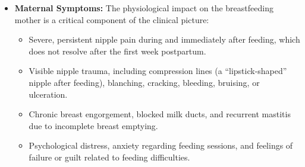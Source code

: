 \begin{itemize}
\begin{itemize}
    \end{itemize}
  \item \textbf{Maternal Symptoms:} The physiological impact on the breastfeeding mother is a critical component of the clinical picture:
    \begin{itemize}
      \item Severe, persistent nipple pain during and immediately after feeding, which does not resolve after the first week postpartum.
      \item Visible nipple trauma, including compression lines (a ``lipstick-shaped'' nipple after feeding), blanching, cracking, bleeding, bruising, or ulceration.
      \item Chronic breast engorgement, blocked milk ducts, and recurrent mastitis due to incomplete breast emptying.
      \item Psychological distress, anxiety regarding feeding sessions, and feelings of failure or guilt related to feeding difficulties.
    \end{itemize}
\end{itemize}

